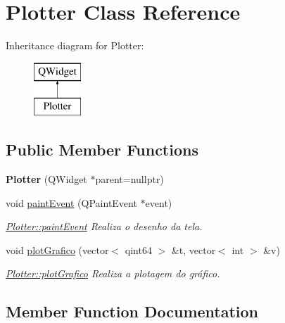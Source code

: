 \hypertarget{class_plotter}{}\section{Plotter Class Reference}
\label{class_plotter}
Inheritance diagram for Plotter\+:\begin{figure}[H]
\begin{center}
\leavevmode
\includegraphics[height=2.000000cm]{class_plotter}
\end{center}
\end{figure}
\subsection*{Public Member Functions}
\begin{DoxyCompactItemize}
\item 
\mbox{\label{class_plotter_a1807627530de30ae58dff3c42a823497}} 
{\bfseries Plotter} (Q\+Widget $\ast$parent=nullptr)
\item 
void \mbox{\hyperlink{class_plotter_a06477bf987646f000a8982db1352a11d}{paint\+Event}} (Q\+Paint\+Event $\ast$event)
\begin{DoxyCompactList}\small\item\em \mbox{\hyperlink{class_plotter_a06477bf987646f000a8982db1352a11d}{Plotter\+::paint\+Event}} Realiza o desenho da tela. \end{DoxyCompactList}\item 
void \mbox{\hyperlink{class_plotter_a29034483f5519c5bf9dac3ac849e0466}{plot\+Grafico}} (vector$<$ qint64 $>$ \&t, vector$<$ int $>$ \&v)
\begin{DoxyCompactList}\small\item\em \mbox{\hyperlink{class_plotter_a29034483f5519c5bf9dac3ac849e0466}{Plotter\+::plot\+Grafico}} Realiza a plotagem do gráfico. \end{DoxyCompactList}\end{DoxyCompactItemize}


\subsection{Member Function Documentation}
\mbox{\label{class_plotter_a06477bf987646f000a8982db1352a11d}} 
